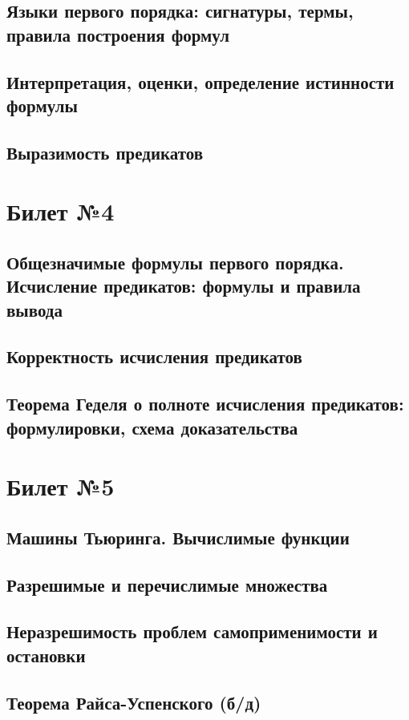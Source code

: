 \documentclass[a4paper]{article}
\theoremstyle{plain}
\theoremstyle{remark}
\theoremstyle{definition}
\begin{document}
\subsection{Языки первого порядка: сигнатуры, термы, правила построения формул}
\subsection{Интерпретация, оценки, определение истинности формулы}
\subsection{Выразимость предикатов}

\section{Билет №4}
\subsection{Общезначимые формулы первого порядка. Исчисление предикатов: формулы и правила вывода}
\subsection{Корректность исчисления предикатов}
\subsection{Теорема Геделя о полноте исчисления предикатов: формулировки, схема доказательства}

\section{Билет №5}
\subsection{Машины Тьюринга. Вычислимые функции}
\subsection{Разрешимые и перечислимые множества}
\subsection{Неразрешимость проблем самоприменимости и остановки}
\subsection{Теорема Райса-Успенского (б/д)}
\end{document}
